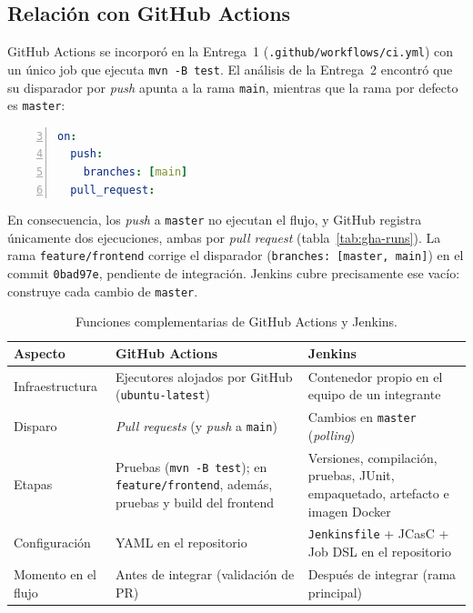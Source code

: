 \documentclass[11pt,a4paper]{article}
\begin{document}
\subsection{Relación con GitHub Actions}
\label{sec:gha}

GitHub Actions se incorporó en la Entrega~1 (\texttt{.github/workflows/ci.yml}) con un único job que
ejecuta \texttt{mvn -B test}. El análisis de la Entrega~2 encontró que su disparador por \emph{push}
apunta a la rama \texttt{main}, mientras que la rama por defecto es \texttt{master}:

\begin{lstlisting}[language=yaml,caption={\texttt{.github/workflows/ci.yml} en \texttt{master}, líneas 3--6.},label={lst:gha-trigger},numbers=left,firstnumber=3]
on:
  push:
    branches: [main]
  pull_request:
\end{lstlisting}

En consecuencia, los \emph{push} a \texttt{master} no ejecutan el flujo, y GitHub registra
únicamente dos ejecuciones, ambas por \emph{pull request} (tabla~\ref{tab:gha-runs}). La rama
\texttt{feature/frontend} corrige el disparador (\texttt{branches: [master, main]}) en el commit
\texttt{0bad97e}, pendiente de integración. Jenkins cubre precisamente ese vacío: construye cada
cambio de \texttt{master}.

\begin{table}[H]
\centering
\small
\begin{tabularx}{\textwidth}{@{}P{3.0cm} L L@{}}
\toprule
\textbf{Aspecto} & \textbf{GitHub Actions} & \textbf{Jenkins}\\
\midrule
Infraestructura & Ejecutores alojados por GitHub (\texttt{ubuntu-latest}) & Contenedor propio en el
equipo de un integrante\\
Disparo & \emph{Pull requests} (y \emph{push} a \texttt{main}) & Cambios en \texttt{master}
(\emph{polling})\\
Etapas & Pruebas (\texttt{mvn -B test}); en \texttt{feature/frontend}, además, pruebas y build del
frontend & Versiones, compilación, pruebas, JUnit, empaquetado, artefacto e imagen Docker\\
Configuración & YAML en el repositorio & \texttt{Jenkinsfile} + JCasC + Job DSL en el repositorio\\
Momento en el flujo & Antes de integrar (validación de PR) & Después de integrar (rama principal)\\
\bottomrule
\end{tabularx}
\caption{Funciones complementarias de GitHub Actions y Jenkins.}
\label{tab:gha-vs-jenkins}
\end{table}
\end{document}
